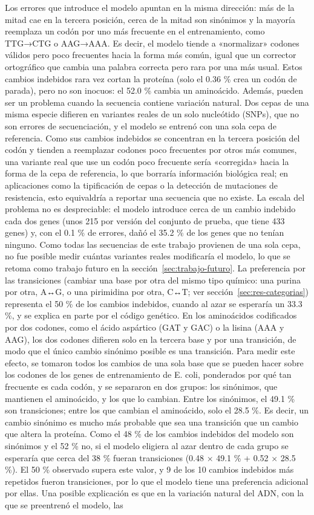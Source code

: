 \documentclass[sigconf,nonacm]{acmart}
\begin{document}
Los errores que introduce el modelo apuntan en la misma dirección: más de la mitad cae en la tercera posición, cerca de la mitad son sinónimos y la mayoría reemplaza un codón por uno más frecuente en el entrenamiento, como TTG→CTG o AAG→AAA. Es decir, el modelo tiende a «normalizar» codones válidos pero poco frecuentes hacia la forma más común, igual que un corrector ortográfico que cambia una palabra correcta pero rara por una más usual. Estos cambios indebidos rara vez cortan la proteína (solo el 0.36 \% crea un codón de parada), pero no son inocuos: el 52.0 \% cambia un aminoácido. Además, pueden ser un problema cuando la secuencia contiene variación natural. Dos cepas de una misma especie difieren en variantes reales de un solo nucleótido (SNPs), que no son errores de secuenciación, y el modelo se entrenó con una sola cepa de referencia. Como sus cambios indebidos se concentran en la tercera posición del codón y tienden a reemplazar codones poco frecuentes por otros más comunes, una variante real que use un codón poco frecuente sería «corregida» hacia la forma de la cepa de referencia, lo que borraría información biológica real; en aplicaciones como la tipificación de cepas o la detección de mutaciones de resistencia, esto equivaldría a reportar una secuencia que no existe. La escala del problema no es despreciable: el modelo introduce cerca de un cambio indebido cada dos genes (unos 215 por versión del conjunto de prueba, que tiene 433 genes) y, con el 0.1 \% de errores, dañó el 35.2 \% de los genes que no tenían ninguno. Como todas las secuencias de este trabajo provienen de una sola cepa, no fue posible medir cuántas variantes reales modificaría el modelo, lo que se retoma como trabajo futuro en la sección~\ref{sec:trabajo-futuro}. La preferencia por las transiciones (cambiar una base por otra del mismo tipo químico: una purina por otra, A↔G, o una pirimidina por otra, C↔T; ver sección~\ref{sec:res-categorias}) representa el 50 \% de los cambios indebidos, cuando al azar se esperaría un 33.3 \%, y se explica en parte por el código genético. En los aminoácidos codificados por dos codones, como el ácido aspártico (GAT y GAC) o la lisina (AAA y AAG), los dos codones difieren solo en la tercera base y por una transición, de modo que el único cambio sinónimo posible es una transición. Para medir este efecto, se tomaron todos los cambios de una sola base que se pueden hacer sobre los codones de los genes de entrenamiento de E. coli, ponderados por qué tan frecuente es cada codón, y se separaron en dos grupos: los sinónimos, que mantienen el aminoácido, y los que lo cambian. Entre los sinónimos, el 49.1 \% son transiciones; entre los que cambian el aminoácido, solo el 28.5 \%. Es decir, un cambio sinónimo es mucho más probable que sea una transición que un cambio que altera la proteína. Como el 48 \% de los cambios indebidos del modelo son sinónimos y el 52 \% no, si el modelo eligiera al azar dentro de cada grupo se esperaría que cerca del 38 \% fueran transiciones (0.48 × 49.1 \% + 0.52 × 28.5 \%). El 50 \% observado supera este valor, y 9 de los 10 cambios indebidos más repetidos fueron transiciones, por lo que el modelo tiene una preferencia adicional por ellas. Una posible explicación es que en la variación natural del ADN, con la que se preentrenó el modelo, las 
\end{document}
